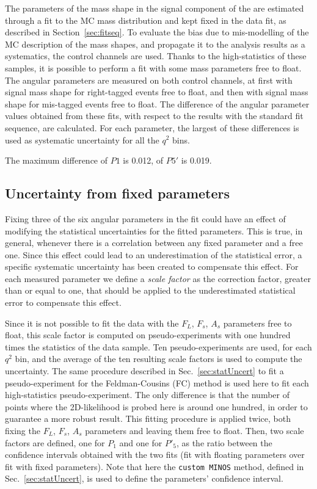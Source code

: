 The parameters of the mass shape in the signal component of the \pdf are estimated through a fit to the MC mass distribution and kept fixed in the data fit, as described in Section~\ref{sec:fitseq}.
To evaluate the bias due to mis-modelling of the MC description of the mass shapes, and propagate it to the analysis results as a systematics, the control channels are used.
Thanks to the high-statistics of these samples, it is possible to perform a fit with some mass parameters free to float.
The angular parameters are measured on both control channels, at first with signal mass shape for right-tagged events free to float, and then with signal mass shape for mis-tagged events free to float.
The difference of the angular parameter values obtained from these fits, with respect to the results with the standard fit sequence, are calculated.
For each parameter, the largest of these differences is used as systematic uncertainty for all the $q^2$ bins.

The maximum difference of $P1$ is 0.012, of $P5'$ is 0.019.

\subsection{Uncertainty from fixed \pdf parameters}
\label{sec:sys-fixedparm}

Fixing three of the six angular parameters in the fit could have an effect of modifying the statistical uncertainties for the fitted parameters.
This is true, in general, whenever there is a correlation between any fixed parameter and a free one.
Since this effect could lead to an underestimation of the statistical error, a specific systematic uncertainty has been created to compensate this effect.
For each measured parameter we define a \textit{scale factor} as the correction factor, greater than or equal to one, that should be applied to the underestimated statistical error to compensate this effect. 


Since it is not possible to fit the data with the $F_L$, $F_s$, $A_s$ parameters free to float, this scale factor is computed on pseudo-experiments with one hundred times the statistics of the data sample.
Ten pseudo-experiments are used, for each $q^2$ bin, and the average of the ten resulting scale factors is used to compute the uncertainty.
The same procedure described in Sec.~\ref{sec:statUncert} to fit a pseudo-experiment for the Feldman-Cousins (FC) method is used here to fit each high-statistics pseudo-experiment.
The only difference is that the number of points where the 2D-likelihood is probed here is around one hundred, in order to guarantee a more robust result.
This fitting procedure is applied twice, both fixing the $F_L$, $F_s$, $A_s$ parameters and leaving them free to float.
Then, two scale factors are defined, one for $P_1$ and one for $P'_5$, as the ratio between the confidence intervals obtained with the two fits (fit with floating parameters over fit with fixed parameters).
Note that here the {\tt custom MINOS} method, defined in Sec.~\ref{sec:statUncert}, is used to define the parameters' confidence interval.

